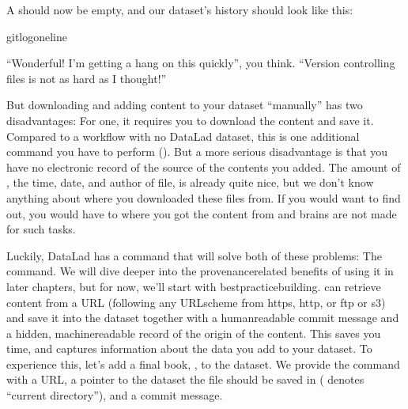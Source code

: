 \sphinxAtStartPar
A  should now be empty, and our dataset’s history should look like this:

\ignorespaces 
\def\sphinxLiteralBlockLabel{\label{\detokenize{basics/101-102-populate:index-11}}}
\begin{sphinxVerbatim}[commandchars=\\\{\}]
gitlog\PYGZhy{}\PYGZhy{}oneline
\end{sphinxVerbatim}

\sphinxAtStartPar
“Wonderful! I’m getting a hang on this quickly”, you think. “Version controlling
files is not as hard as I thought!”

\sphinxAtStartPar
But downloading and adding content to your dataset “manually” has two
disadvantages: For one, it requires you to download the content and save it.
Compared to a workflow with no DataLad dataset, this is one additional command
you have to perform (). But a more
serious disadvantage is that you have no electronic record of the source of the
contents you added. The amount of {\hyperref[\detokenize{glossary:term-provenance}]{}}, the time, date, and author
of file, is already quite nice, but we don’t know anything about where you downloaded
these files from. If you would want to find out, you would have to 
where you got the content from \textendash{} and brains are not made for such tasks.

\sphinxAtStartPar
Luckily, DataLad has a command that will solve both of these problems:
The  command.
We will dive deeper into the provenance\sphinxhyphen{}related benefits of using it in later chapters, but for now,
we’ll start with best\sphinxhyphen{}practice\sphinxhyphen{}building.  can retrieve content
from a URL (following any URL\sphinxhyphen{}scheme from https, http, or ftp or s3) and save it
into the dataset together with a human\sphinxhyphen{}readable commit message and a hidden,
machine\sphinxhyphen{}readable record of the origin of the content. This saves you time,
and captures {\hyperref[\detokenize{glossary:term-provenance}]{}} information about the data you add to your dataset.
To experience this, let’s add a final book,
,
to the dataset. We provide the command with a URL, a pointer to the dataset the
file should be saved in ( denotes “current directory”), and a commit message.

